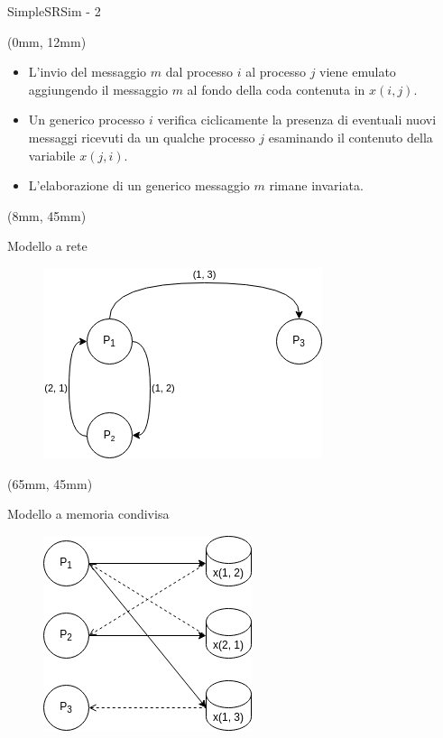 \documentclass{beamer}
\begin{document}
    \begin{frame}{SimpleSRSim - 2}
        \begin{textblock*}{\textwidth}
            (0mm, 12mm)
            \begin{itemize}
                \item L'invio del messaggio $m$ dal processo $i$ al processo $j$ viene emulato aggiungendo il messaggio $m$ al fondo della coda contenuta in $x(i, j)$.
                \item Un generico processo $i$ verifica ciclicamente la presenza di eventuali nuovi messaggi ricevuti da un qualche processo $j$ esaminando il contenuto della variabile $x(j, i)$.
                \item L'elaborazione di un generico messaggio $m$ rimane invariata.
            \end{itemize}
        \end{textblock*}
        \begin{textblock*}{0.4\textwidth}
            (8mm, 45mm)
            \begin{block}{Modello a rete}
                \begin{figure}
                    \centering
                    \includegraphics[scale=0.4]{test_sr.png}
                \end{figure}
            \end{block}
        \end{textblock*}
        \begin{textblock*}{0.45\textwidth}
            (65mm, 45mm)

            \begin{block}{Modello a memoria condivisa}
                \begin{figure}
                    \centering
                    \includegraphics[scale=0.4]{test_sm.png}
                \end{figure}
            \end{block}
        \end{textblock*}
    \end{frame}
\end{document}
